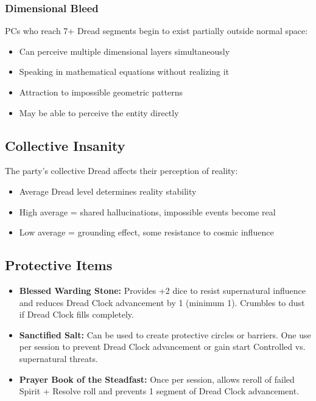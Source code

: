 \documentclass[11pt]{article}
\begin{document}
\subsubsection{Dimensional Bleed}

PCs who reach 7+ Dread segments begin to exist partially outside normal space:
\begin{itemize}
\item Can perceive multiple dimensional layers simultaneously
\item Speaking in mathematical equations without realizing it
\item Attraction to impossible geometric patterns
\item May be able to perceive the entity directly
\end{itemize}

\subsection{Collective Insanity}

The party's collective Dread affects their perception of reality:
\begin{itemize}
\item Average Dread level determines reality stability
\item High average = shared hallucinations, impossible events become real
\item Low average = grounding effect, some resistance to cosmic influence
\end{itemize}

\subsection{Protective Items}

\begin{itemize}
\item \textbf{Blessed Warding Stone:} Provides +2 dice to resist supernatural influence and reduces Dread Clock advancement by 1 (minimum 1). Crumbles to dust if Dread Clock fills completely.
\item \textbf{Sanctified Salt:} Can be used to create protective circles or barriers. One use per session to prevent Dread Clock advancement or gain start Controlled vs. supernatural threats.
\item \textbf{Prayer Book of the Steadfast:} Once per session, allows reroll of failed Spirit + Resolve roll and prevents 1 segment of Dread Clock advancement.
\end{itemize}
\end{document}
